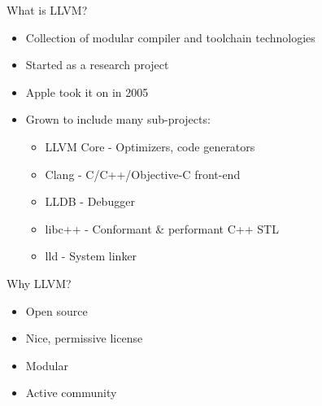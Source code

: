 

\begin{frame}{What is LLVM?}

\begin{itemize}
    \item Collection of modular compiler and toolchain technologies
    \item Started as a research project
    \item Apple took it on in 2005
    \item Grown to include many sub-projects:
    \begin{itemize}
      \item LLVM Core - Optimizers, code generators
      \item Clang     - C/C++/Objective-C front-end
      \item LLDB      - Debugger
      \item libc++    - Conformant \& performant C++ STL
      \item lld       - System linker
    \end{itemize}
\end{itemize}

\end{frame}


\begin{frame}{Why LLVM?}

\begin{itemize}
    \item Open source
    \item Nice, permissive license
    \item Modular
    \item Active community
\end{itemize}

\end{frame}



